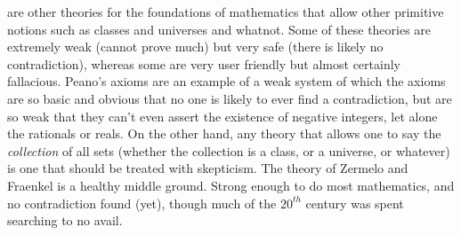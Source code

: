         are other theories for the foundations of mathematics that allow other
        primitive notions such as classes and universes and whatnot. Some of
        these theories are extremely weak (cannot prove much) but very safe
        (there is likely no contradiction), whereas some are very user friendly
        but almost certainly fallacious. Peano's axioms are an example of a weak
        system of which the axioms are so basic and obvious that no one is
        likely to ever find a contradiction, but are so weak that they can't
        even assert the existence of negative integers, let alone the rationals
        or reals. On the other hand, any theory that allows one to say the
        \textit{collection} of all sets (whether the collection is a class, or a
        universe, or whatever) is one that should be treated with skepticism.
        The theory of Zermelo and Fraenkel is a healthy middle ground. Strong
        enough to do most mathematics, and no contradiction found (yet), though
        much of the $20^{th}$ century was spent searching to no avail.
